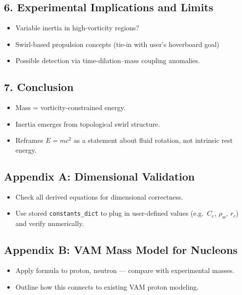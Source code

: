 \subsection*{6. Experimental Implications and Limits}

\begin{itemize}
    \item Variable inertia in high-vorticity regions?
    \item Swirl-based propulsion concepts (tie-in with user’s hoverboard goal)
    \item Possible detection via time-dilation--mass coupling anomalies.
\end{itemize}

\subsection*{7. Conclusion}

\begin{itemize}
    \item Mass = vorticity-constrained energy.
    \item Inertia emerges from topological swirl structure.
    \item Reframes $E=mc^2$ as a statement about fluid rotation, not intrinsic rest energy.
\end{itemize}

\subsection*{Appendix A: Dimensional Validation}

\begin{itemize}
    \item Check all derived equations for dimensional correctness.
    \item Use stored \texttt{constants\_dict} to plug in user-defined values (e.g.\ $C_e$, $\rho_\text{\ae}$, $r_c$) and verify numerically.
\end{itemize}


\subsection*{Appendix B: VAM Mass Model for Nucleons}

\begin{itemize}
    \item Apply formula to proton, neutron — compare with experimental masses.
    \item Outline how this connects to existing VAM proton modeling.
\end{itemize}


